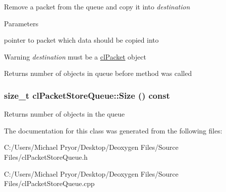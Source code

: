 \label{classcl_packet_store_queue_ac5758eef3544e8c4b8d4b4344cce5f2d}
Remove a packet from the queue and copy it into {\itshape destination\/} 
\begin{DoxyParams}{Parameters}
\item[{\em destination}]pointer to packet which data should be copied into \end{DoxyParams}
\begin{DoxyWarning}{Warning}
{\itshape destination\/} must be a \hyperlink{classcl_packet}{clPacket} object 
\end{DoxyWarning}
\begin{DoxyReturn}{Returns}
number of objects in queue before method was called 
\end{DoxyReturn}
\hypertarget{classcl_packet_store_queue_a022743398c3c8ad4bf4f48c7ce5e0261}{
\subsubsection[{Size}]{\setlength{\rightskip}{0pt plus 5cm}size\_\-t clPacketStoreQueue::Size () const}}
\label{classcl_packet_store_queue_a022743398c3c8ad4bf4f48c7ce5e0261}
\begin{DoxyReturn}{Returns}
number of objects in the queue 
\end{DoxyReturn}


The documentation for this class was generated from the following files:\begin{DoxyCompactItemize}
\item 
C:/Users/Michael Pryor/Desktop/Deoxygen Files/Source Files/clPacketStoreQueue.h\item 
C:/Users/Michael Pryor/Desktop/Deoxygen Files/Source Files/clPacketStoreQueue.cpp\end{DoxyCompactItemize}
